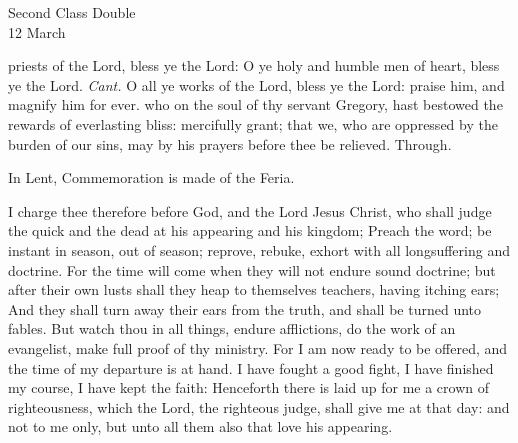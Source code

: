 \begin{inhead}
    {Second Class Double\\
12 March}
\end{inhead}
\par\noindent
{}


\introit
{} priests of the Lord, bless ye the Lord: O ye holy and humble
men of heart, bless ye the Lord. \textit{Cant.} O all ye works of the Lord, bless ye the Lord: praise him, and magnify him for ever.
\collect
{} who on the soul of thy servant Gregory, hast bestowed the rewards of everlasting bliss: mercifully grant; that we, who are oppressed by the burden of our sins, may by his prayers before thee be relieved. Through.
\begin{rubric}
    In Lent, Commemoration is made of the Feria.%
\end{rubric}
 I charge thee therefore before God, and the Lord Jesus Christ, who shall judge the quick and the dead at his appearing and his kingdom; Preach the word; be instant in season, out of season; reprove, rebuke, exhort with all longsuffering and doctrine. For the time will come when they will not endure sound doctrine; but after their own lusts shall they heap to themselves teachers, having itching ears; And they shall turn away their ears from the truth, and shall be turned unto fables. But watch thou in all things, endure afflictions, do the work of an evangelist, make full proof of thy ministry. For I am now ready to be offered, and the time of my departure is at hand. I have fought a good fight, I have finished my course, I have kept the faith: Henceforth there is laid up for me a crown of righteousness, which the Lord, the righteous judge, shall give me at that day: and not to me only, but unto all them also that love his appearing.
